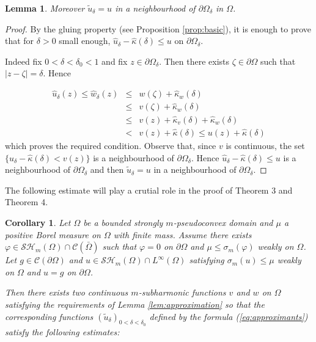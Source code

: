 \documentclass[12pt]{amsart}
\newtheorem{lemma}[theorem]{Lemma}
\newtheorem{corollary}[theorem]{Corollary}
\theoremstyle{definition}
\numberwithin{theorem}{section}
\numberwithin{equation}{section}
\newcommand{\Om}{\Omega}
\begin{document}
{\begin{lemma}
Moreover $\tilde{u}_{\delta} = u$ in a neighbourhood of $\partial \Omega_\delta$ in $\Omega$.
\end{lemma}
\begin{proof} By the gluing property (see Proposition \ref{prop:basic}),  it is enough to prove that for $\delta > 0$ small enough, $ \widehat{u}_{\delta} -   \widehat{\kappa} (\delta) \leq  u $ on $\partial \Omega_\delta$. 


 Indeed fix $0 < \delta < \delta_0 < 1$ and  fix $z \in \partial \Omega_\delta$. Then there exists $\zeta \in \partial \Omega$ such that $\vert z - \zeta \vert = \delta$. Hence   
 
 \begin{eqnarray*}
 \widehat{u}_{\delta} (z)  \leq   \widehat{w}_\delta (z) & \leq & w (\zeta) + \widehat{\kappa}_w (\delta)  \\
 & \leq & v (\zeta)  + \widehat{\kappa}_w (\delta)  \\
 & \leq & v (z) +   \widehat{\kappa}_v (\delta) + \widehat{\kappa}_w (\delta) \\
& <  &  v  (z) +   \widehat{\kappa} (\delta) \leq u(z) +  \widehat{\kappa} (\delta)
 \end{eqnarray*} 
 which proves the required condition. Observe that, since $v$ is continuous, the set   $ \{\widehat{u}_\delta  -  \widehat{\kappa} (\delta) < v(z) \} $ is a neighbourhood of $\partial \Omega_\delta$. Hence  $\widehat{u}_\delta - \widehat{\kappa} (\delta) \leq u $ is a neighbourhood of $\partial \Omega_\delta$ and then  $\tilde{u}_{\delta} = u$ in a neighbourhood of $\partial \Omega_\delta$. 
 \end{proof}
 
 The following estimate will play a crutial role in the proof of Theorem 3 and Theorem 4.
 
\begin{corollary}\label{cor:approximation} Let $\Om$ be a bounded strongly $m$-pseudoconvex domain and  $\mu$ a positive Borel measure on $\Omega$ with finite mass. Assume there exists  $\varphi \in  \mathcal{SH}_m (\Omega) \cap \mathcal C (\bar \Omega)$ such that $\varphi = 0$ on $\partial \Omega$ and $\mu \leq \sigma_m (\varphi)$ weakly on $\Omega$.
Let $ g \in \mathcal C (\partial \Omega)$ and $u \in \mathcal{SH}_m (\Omega) \cap L^{\infty} ( \Omega)$ satisfying $\sigma_m (u) \leq \mu$ weakly on $\Omega$ and $u = g$ on $\partial \Omega$.

Then there exists two  continuous $m$-subharmonic functions $v$ and $ w$ on $\Omega$ satisfying the requirements of Lemma \ref{lem:approximation} so that the corresponding functions  $ (\tilde{u}_\delta)_{0 < \delta < \delta_0} $  defined by the formula (\ref{eq:approximants}) satisfy the following estimates: 


\end{corollary}}
\end{document}
